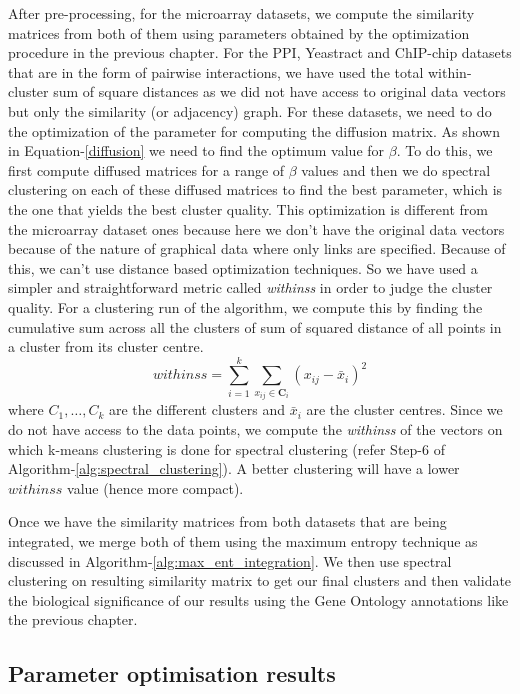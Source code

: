 After pre-processing, for the microarray datasets, we compute the similarity matrices from both of them using parameters obtained by 
the optimization procedure in the previous chapter. For the PPI, Yeastract and ChIP-chip datasets that are in the form 
of pairwise interactions, we have used the total within-cluster sum of square distances as we did not have access to original data vectors but only 
the similarity (or adjacency) graph. For these datasets, we need to do the optimization of the parameter for computing the diffusion matrix. 
As shown in Equation-\ref{diffusion} we need to find the optimum value for $\beta$. To do this, we first compute diffused matrices for a range of $\beta$ values 
and then we do spectral clustering on each of these diffused matrices to find the best parameter, which is the one that yields the best cluster quality. This 
optimization is different from the microarray dataset ones because here we don't have the original data vectors because of the nature of graphical data where only 
links are specified. Because of this, we can't use distance based optimization techniques. So we have used a simpler and straightforward metric called \textit{withinss} in order 
to judge the cluster quality. For a clustering run of the algorithm, we compute this by finding the cumulative sum across all the clusters of sum of squared 
distance of all points in a cluster from its cluster centre.
\begin{equation}
    \mathit{withinss}=\sum_{i=1}^{k}\sum_{x_{ij}\in \mathbf{C}_{i}}(x_{ij}-\bar{x}_{i})^2   \label{maxent:eqn:withinss}
\end{equation}
where $C_{1},\dots,C_{k}$ are the different clusters and $\bar{x}_{i}$ are the cluster centres. Since we do not have access to the data points, we compute the \textit{withinss} of the vectors on which k-means clustering is done for spectral clustering (refer Step-6 of Algorithm-\ref{alg:spectral_clustering}). A better clustering will have a lower $withinss$ value (hence more compact). 
 
Once we have the similarity matrices from both datasets that are being integrated, we merge both of them using the maximum entropy technique as 
discussed in Algorithm-\ref{alg:max_ent_integration}. We then use spectral clustering on resulting similarity matrix to get our final clusters and then validate 
the biological significance of our results using the Gene Ontology annotations like the previous chapter.

\subsection{Parameter optimisation results}\label{param_optimisation}

